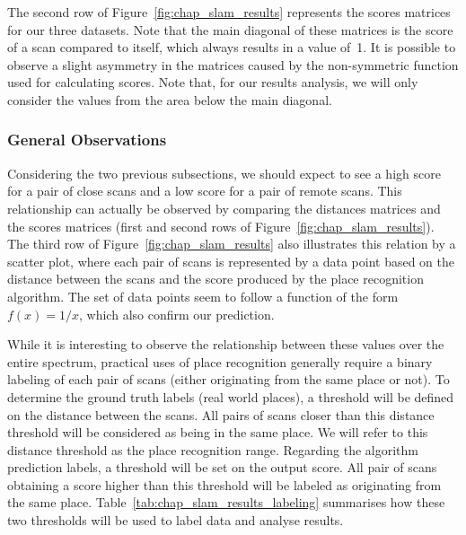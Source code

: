 The second row of Figure~\ref{fig:chap_slam_results} represents the scores matrices for our three datasets. Note that the main diagonal of these matrices is the score of a scan compared to itself, which always results in a value of~1. It is possible to observe a slight asymmetry in the matrices caused by the non-symmetric function used for calculating scores. Note that, for our results analysis, we will only consider the values from the area below the main diagonal.


\subsubsection{General Observations}
\label{ssec:chap_slam_results_evaluation}

Considering the two previous subsections, we should expect to see a high score for a pair of close scans and a low score for a pair of remote scans. This relationship can actually be observed by comparing the distances matrices and the scores matrices (first and second rows of Figure~\ref{fig:chap_slam_results}). The third row of Figure~\ref{fig:chap_slam_results} also illustrates this relation by a scatter plot, where each pair of scans is represented by a data point based on the distance between the scans and the score produced by the place recognition algorithm. The set of data points seem to follow a function of the form $f(x) = 1 / x$, which also confirm our prediction.

While it is interesting to observe the relationship between these values over the entire spectrum, practical uses of place recognition generally require a binary labeling of each pair of scans (either originating from the same place or not). To determine the ground truth labels (real world places), a threshold will be defined on the distance between the scans. All pairs of scans closer than this distance threshold will be considered as being in the same place. We will refer to this distance threshold as the place recognition range. Regarding the algorithm prediction labels, a threshold will be set on the output score. All pair of scans obtaining a score higher than this threshold will be labeled as originating from the same place. Table~\ref{tab:chap_slam_results_labeling} summarises how these two thresholds will be used to label data and analyse results.

